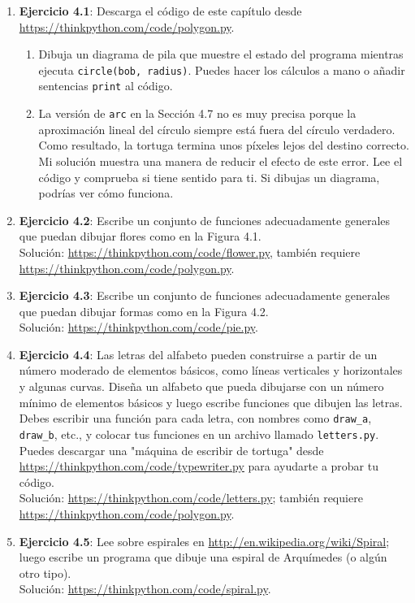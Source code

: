 \begin{enumerate}
    \item \textbf{Ejercicio 4.1}: Descarga el código de este capítulo desde \url{https://thinkpython.com/code/polygon.py}.
    \begin{enumerate}
        \item Dibuja un diagrama de pila que muestre el estado del programa mientras ejecuta \texttt{circle(bob, radius)}. Puedes hacer los cálculos a mano o añadir sentencias \texttt{print} al código.
        \item La versión de \texttt{arc} en la Sección 4.7 no es muy precisa porque la aproximación lineal del círculo siempre está fuera del círculo verdadero. Como resultado, la tortuga termina unos píxeles lejos del destino correcto. Mi solución muestra una manera de reducir el efecto de este error. Lee el código y comprueba si tiene sentido para ti. Si dibujas un diagrama, podrías ver cómo funciona.
    \end{enumerate}
    
    \item \textbf{Ejercicio 4.2}: Escribe un conjunto de funciones adecuadamente generales que puedan dibujar flores como en la Figura 4.1. \\
    Solución: \url{https://thinkpython.com/code/flower.py}, también requiere \url{https://thinkpython.com/code/polygon.py}.
    
    \item \textbf{Ejercicio 4.3}: Escribe un conjunto de funciones adecuadamente generales que puedan dibujar formas como en la Figura 4.2. \\
    Solución: \url{https://thinkpython.com/code/pie.py}.
    
    \item \textbf{Ejercicio 4.4}: Las letras del alfabeto pueden construirse a partir de un número moderado de elementos básicos, como líneas verticales y horizontales y algunas curvas. Diseña un alfabeto que pueda dibujarse con un número mínimo de elementos básicos y luego escribe funciones que dibujen las letras. \\
    Debes escribir una función para cada letra, con nombres como \texttt{draw\_a}, \texttt{draw\_b}, etc., y colocar tus funciones en un archivo llamado \texttt{letters.py}. Puedes descargar una "máquina de escribir de tortuga" desde \url{https://thinkpython.com/code/typewriter.py} para ayudarte a probar tu código. \\
    Solución: \url{https://thinkpython.com/code/letters.py}; también requiere \url{https://thinkpython.com/code/polygon.py}.
    
    \item \textbf{Ejercicio 4.5}: Lee sobre espirales en \url{http://en.wikipedia.org/wiki/Spiral}; luego escribe un programa que dibuje una espiral de Arquímedes (o algún otro tipo). \\
    Solución: \url{https://thinkpython.com/code/spiral.py}.
\end{enumerate}

